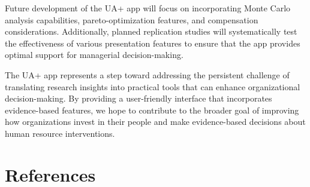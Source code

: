 \documentclass[
]{article}
\begin{document}
Future development of the UA+ app will focus on incorporating Monte
Carlo analysis capabilities, pareto-optimization features, and
compensation considerations. Additionally, planned replication studies
will systematically test the effectiveness of various presentation
features to ensure that the app provides optimal support for managerial
decision-making.

The UA+ app represents a step toward addressing the persistent challenge
of translating research insights into practical tools that can enhance
organizational decision-making. By providing a user-friendly interface
that incorporates evidence-based features, we hope to contribute to the
broader goal of improving how organizations invest in their people and
make evidence-based decisions about human resource interventions.

\section{References}\label{references}
\end{document}
